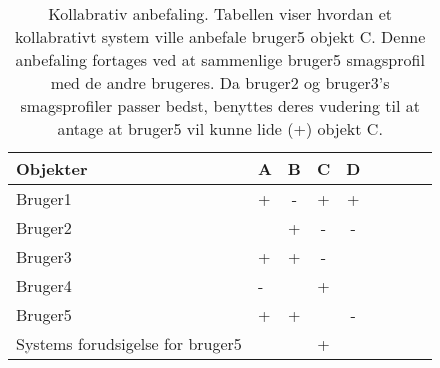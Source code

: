 \begin{table}[H]
  \centering
      \begin{tabular}{l|lccccccc}
      \textbf{Objekter}                 & A        & B       & C       & D  \\ \hline
      Bruger1                           & +        & -       & +       & +  \\
      Bruger2                           &          & +       & -       & -  \\
      Bruger3                           & +        & +       & -       &    \\
      Bruger4  		                      & -        &         & +       &    \\ \hline
      Bruger5  		                      & +        & +       &         & -  \\ \hline
      Systems forudsigelse for bruger5  &          &         & +       &    \\


    \end{tabular}
  \caption{Kollabrativ anbefaling. Tabellen viser hvordan et kollabrativt system ville anbefale bruger5 objekt C.
            Denne anbefaling fortages ved at sammenlige bruger5 smagsprofil med de andre brugeres.
            Da bruger2 og bruger3's smagsprofiler passer bedst, benyttes deres vudering til at antage at bruger5 vil kunne lide (+) objekt C.
            \citep{kollabrativEksempel}}\label{tabel:kollabrativ}
\end{table}
